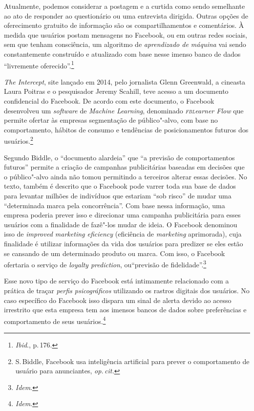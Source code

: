 Atualmente, podemos considerar a postagem e a curtida como sendo
semelhante ao ato de responder ao questionário ou uma entrevista
dirigida. Outras opções de oferecimento gratuito de informação são
os compartilhamentos e comentários. À medida que usuários postam
mensagens no Facebook, ou em outras redes sociais, sem que tenham
consciência, um algoritmo de \textit{aprendizado de máquina} vai sendo
constantemente construído e atualizado com base nesse imenso banco de
dados ``livremente oferecido''.\footnote{\textit{Ibid}., p.\,176.}

\textit{The Intercept}, site lançado em 2014, pelo jornalista Glenn
Greenwald, a cineasta Laura Poitras e o pesquisador Jeremy Scahill, teve
acesso a um documento confidencial do Facebook. De acordo com este
documento, o Facebook desenvolveu um \textit{software} de \textit{Machine
Learning}, denominado \textit{\textsc{fbl}earner Flow} que permite ofertar às
empresas segmentação de público"-alvo, com base no comportamento,
hábitos de consumo e tendências de posicionamentos futuros dos usuários.\footnote{S.\,Biddle, Facebook usa inteligência artificial para prever o
comportamento de usuário para anunciantes, \textit{op.\,cit.}}

Segundo Biddle, o ``documento alardeia'' que ``a previsão de
comportamentos futuros'' permite a criação de campanhas publicitárias
baseadas em decisões que o público"-alvo ainda não tomou permitindo a
terceiros alterar essas decisões. No texto, também é descrito que o
Facebook pode varrer toda sua base de dados para levantar milhões de
indivíduos que estariam ``sob risco'' de mudar uma ``determinada marca
pela concorrência''. Com base nessa informação, uma empresa poderia
prever isso e direcionar uma campanha publicitária para esses usuários
com a finalidade de fazê"-los mudar de ideia.
O Facebook denominou isso de \textit{improved marketing eficiency} (eficiência de \textit{marketing}
aprimorada), cuja finalidade é utilizar informações da vida dos usuários
para predizer se eles estão se cansando de um determinado produto ou
marca. Com isso, o Facebook ofertaria o serviço de \textit{loyalty
prediction}, ou``previsão de fidelidade''.\footnote{\textit{Idem}.}

Esse novo tipo de serviço do Facebook está intimamente relacionado com a
prática de traçar \textit{perfis psicográficos} utilizando os rastros
digitais dos usuários. No caso específico do Facebook isso dispara um
sinal de alerta devido ao acesso irrestrito que esta empresa tem aos
imensos bancos de dados sobre preferências e comportamento de seus
usuários.\footnote{\textit{Idem}.}

